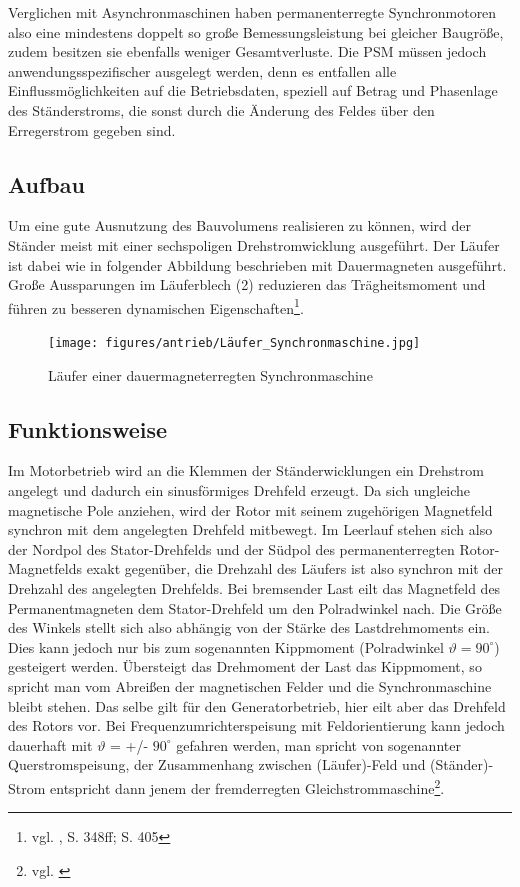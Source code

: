 Verglichen mit Asynchronmaschinen haben permanenterregte Synchronmotoren also eine mindestens doppelt so große Bemessungsleistung bei gleicher Baugröße, zudem besitzen sie ebenfalls weniger Gesamtverluste. Die PSM müssen jedoch anwendungsspezifischer ausgelegt werden, denn es entfallen alle Einflussmöglichkeiten auf die Betriebsdaten, speziell auf Betrag und Phasenlage des Ständerstroms, die sonst durch die Änderung des Feldes über den Erregerstrom gegeben sind.

\subsection{Aufbau}
Um eine gute Ausnutzung des Bauvolumens realisieren zu können, wird der Ständer meist mit einer sechspoligen Drehstromwicklung ausgeführt. Der Läufer ist dabei wie in folgender Abbildung beschrieben mit Dauermagneten ausgeführt. Große Aussparungen im Läuferblech (2) reduzieren das Trägheitsmoment und führen zu besseren dynamischen Eigenschaften\footnote{vgl. \cite{Fischer}, S. 348ff; S. 405}.
\\[3mm]
\begin{figure}[H]
	\begin{center}
		\texttt{[image: figures/antrieb/Läufer\_Synchronmaschine.jpg]}
		\caption{Läufer einer dauermagneterregten Synchronmaschine \cite{Fischer}}
	\end{center}
\end{figure}

\subsection{Funktionsweise}
Im Motorbetrieb wird an die Klemmen der Ständerwicklungen ein Drehstrom angelegt und dadurch ein sinusförmiges Drehfeld erzeugt. Da sich ungleiche magnetische Pole anziehen, wird der Rotor mit seinem zugehörigen Magnetfeld synchron mit dem angelegten Drehfeld mitbewegt. Im Leerlauf stehen sich also der Nordpol des Stator-Drehfelds und der Südpol des permanenterregten Rotor-Magnetfelds exakt gegenüber, die Drehzahl des Läufers ist also synchron mit der Drehzahl des angelegten Drehfelds. Bei bremsender Last eilt das Magnetfeld des Permanentmagneten dem Stator-Drehfeld um den Polradwinkel nach. Die Größe des Winkels stellt sich also abhängig von der Stärke des Lastdrehmoments ein. Dies kann jedoch nur bis zum sogenannten Kippmoment (Polradwinkel $\vartheta = 90^\circ$) gesteigert werden. Übersteigt das Drehmoment der Last das Kippmoment, so spricht man vom \glqq Abreißen\grqq{} der magnetischen Felder und die Synchronmaschine bleibt stehen. Das selbe gilt für den Generatorbetrieb, hier eilt aber das Drehfeld des Rotors vor. Bei Frequenzumrichterspeisung mit Feldorientierung kann jedoch dauerhaft mit $\vartheta$ = +/- $90^\circ$ gefahren werden, man spricht von sogenannter Querstromspeisung, der Zusammenhang zwischen (Läufer)-Feld und (Ständer)-Strom entspricht dann jenem der fremderregten Gleichstrommaschine\footnote{vgl. \cite{Synchronmaschine}}.


